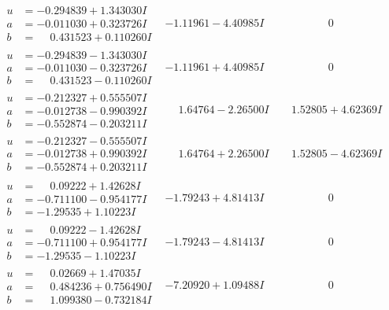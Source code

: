 \documentclass[1p]{elsarticle_modified}
\theoremstyle{definition}
\begin{document}
$$\begin{array}{c|c|c}
\begin{aligned}
u &= -0.294839 + 1.343030 I \\
a &= -0.011030 + 0.323726 I \\
b &= \phantom{-}0.431523 + 0.110260 I\end{aligned}
 & -1.11961 - 4.40985 I & \phantom{-0.000000 } 0 \\ \hline\begin{aligned}
u &= -0.294839 - 1.343030 I \\
a &= -0.011030 - 0.323726 I \\
b &= \phantom{-}0.431523 - 0.110260 I\end{aligned}
 & -1.11961 + 4.40985 I & \phantom{-0.000000 } 0 \\ \hline\begin{aligned}
u &= -0.212327 + 0.555507 I \\
a &= -0.012738 - 0.990392 I \\
b &= -0.552874 - 0.203211 I\end{aligned}
 & \phantom{-}1.64764 - 2.26500 I & \phantom{-}1.52805 + 4.62369 I \\ \hline\begin{aligned}
u &= -0.212327 - 0.555507 I \\
a &= -0.012738 + 0.990392 I \\
b &= -0.552874 + 0.203211 I\end{aligned}
 & \phantom{-}1.64764 + 2.26500 I & \phantom{-}1.52805 - 4.62369 I \\ \hline\begin{aligned}
u &= \phantom{-}0.09222 + 1.42628 I \\
a &= -0.711100 - 0.954177 I \\
b &= -1.29535 + 1.10223 I\end{aligned}
 & -1.79243 + 4.81413 I & \phantom{-0.000000 } 0 \\ \hline\begin{aligned}
u &= \phantom{-}0.09222 - 1.42628 I \\
a &= -0.711100 + 0.954177 I \\
b &= -1.29535 - 1.10223 I\end{aligned}
 & -1.79243 - 4.81413 I & \phantom{-0.000000 } 0 \\ \hline\begin{aligned}
u &= \phantom{-}0.02669 + 1.47035 I \\
a &= \phantom{-}0.484236 + 0.756490 I \\
b &= \phantom{-}1.099380 - 0.732184 I\end{aligned}
 & -7.20920 + 1.09488 I & \phantom{-0.000000 } 0 \\ \hline\begin{aligned}

\end{aligned}
\end{array}$$
\end{document}
